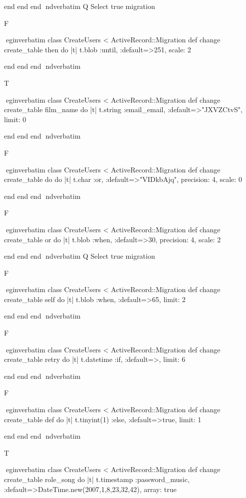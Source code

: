     end 
  end 
end
nd{verbatim}
Q
 Select true migration

F

egin{verbatim}
 class CreateUsers < ActiveRecord::Migration 
  def change 
    create_table then do |t| 
      t.blob :until, :default=>251, scale: 2
    
    end 
  end 
end
nd{verbatim}

T

egin{verbatim}
 class CreateUsers < ActiveRecord::Migration 
  def change 
    create_table film_name do |t| 
      t.string :email_email, :default=>"JXVZCtvS", limit: 0
    
    end 
  end 
end
nd{verbatim}

F

egin{verbatim}
 class CreateUsers < ActiveRecord::Migration 
  def change 
    create_table do do |t| 
      t.char :or, :default=>"VIDkbAjq", precision: 4, scale: 0
    
    end 
  end 
end
nd{verbatim}

F

egin{verbatim}
 class CreateUsers < ActiveRecord::Migration 
  def change 
    create_table or do |t| 
      t.blob :when, :default=>30, precision: 4, scale: 2
    
    end 
  end 
end
nd{verbatim}
Q
 Select true migration

F

egin{verbatim}
 class CreateUsers < ActiveRecord::Migration 
  def change 
    create_table self do |t| 
      t.blob :when, :default=>65, limit: 2
    
    end 
  end 
end
nd{verbatim}

F

egin{verbatim}
 class CreateUsers < ActiveRecord::Migration 
  def change 
    create_table retry do |t| 
      t.datetime :if, :default=>, limit: 6
    
    end 
  end 
end
nd{verbatim}

F

egin{verbatim}
 class CreateUsers < ActiveRecord::Migration 
  def change 
    create_table def do |t| 
      t.tinyint(1) :else, :default=>true, limit: 1
    
    end 
  end 
end
nd{verbatim}

T

egin{verbatim}
 class CreateUsers < ActiveRecord::Migration 
  def change 
    create_table role_song do |t| 
      t.timestamp :password_music, :default=>DateTime.new(2007,1,8,23,32,42), array: true
    
